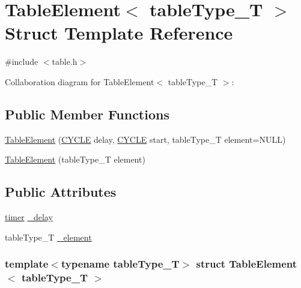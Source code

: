 \hypertarget{structTableElement}{
\section{TableElement$<$ tableType\_\-T $>$ Struct Template Reference}
\label{structTableElement}
}


{\ttfamily \#include $<$table.h$>$}



Collaboration diagram for TableElement$<$ tableType\_\-T $>$:
\subsection*{Public Member Functions}
\begin{DoxyCompactItemize}
\item 
\hyperlink{structTableElement_a4ea30cdbfb27a82488fd8fb422777f74}{TableElement} (\hyperlink{global_2global_8h_a7e19a550ec11d1ed921deb20c22efb5b}{CYCLE} delay, \hyperlink{global_2global_8h_a7e19a550ec11d1ed921deb20c22efb5b}{CYCLE} start, tableType\_\-T element=NULL)
\item 
\hyperlink{structTableElement_aee053def7c4abbfacd0349d5e6f213e0}{TableElement} (tableType\_\-T element)
\end{DoxyCompactItemize}
\subsection*{Public Attributes}
\begin{DoxyCompactItemize}
\item 
\hyperlink{structtimer}{timer} \hyperlink{structTableElement_a360409caa18be13ff49eb33b9761ef51}{\_\-delay}
\item 
tableType\_\-T \hyperlink{structTableElement_a00a6de9a65467916319e8fd276f8f3f9}{\_\-element}
\end{DoxyCompactItemize}
\subsubsection*{template$<$typename tableType\_\-T$>$ struct TableElement$<$ tableType\_\-T $>$}




